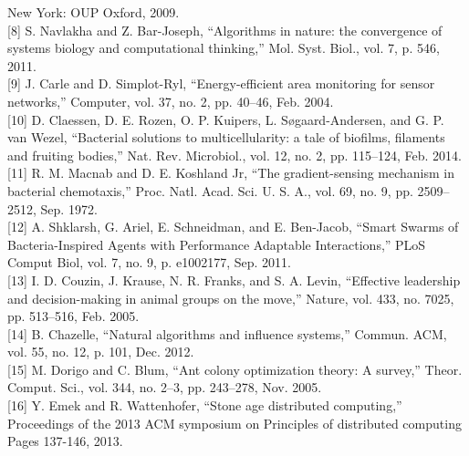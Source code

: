 \documentclass{article}
\begin{document}
New York: OUP Oxford, 2009.\\[8pt]
[8] S. Navlakha and Z. Bar-Joseph, ``Algorithms in nature: the convergence of
systems biology and computational thinking,'' Mol. Syst. Biol., vol. 7, p. 546,
2011.\\[8pt]
[9] J. Carle and D. Simplot-Ryl, ``Energy-efficient area monitoring for sensor
networks,'' Computer, vol. 37, no. 2, pp. 40–46, Feb. 2004.\\[8pt]
[10]    D. Claessen, D. E. Rozen, O. P. Kuipers, L. Søgaard-Andersen, and G. P.
van Wezel, ``Bacterial solutions to multicellularity: a tale of biofilms,
filaments and fruiting bodies,'' Nat. Rev. Microbiol., vol. 12, no. 2, pp.
115–124, Feb. 2014.\\[8pt]
[11]    R. M. Macnab and D. E. Koshland Jr, ``The gradient-sensing mechanism in
bacterial chemotaxis,'' Proc. Natl. Acad. Sci. U. S. A., vol. 69, no. 9, pp.
2509–2512, Sep. 1972.\\[8pt]
[12]    A. Shklarsh, G. Ariel, E. Schneidman, and E. Ben-Jacob, ``Smart Swarms
of Bacteria-Inspired Agents with Performance Adaptable Interactions,'' PLoS
Comput Biol, vol. 7, no. 9, p. e1002177, Sep. 2011.\\[8pt]
[13]    I. D. Couzin, J. Krause, N. R. Franks, and S. A. Levin, ``Effective
leadership and decision-making in animal groups on the move,'' Nature, vol. 433,
no. 7025, pp. 513–516, Feb. 2005.\\[8pt]
[14]    B. Chazelle, ``Natural algorithms and influence systems,'' Commun. ACM,
vol. 55, no. 12, p. 101, Dec. 2012.\\[8pt]
[15]    M. Dorigo and C. Blum, ``Ant colony optimization theory: A survey,''
Theor. Comput. Sci., vol. 344, no. 2–3, pp. 243–278, Nov. 2005.\\[8pt]
[16]    Y. Emek and R. Wattenhofer, ``Stone age distributed computing,''
Proceedings of the 2013 ACM symposium on Principles of distributed computing
Pages 137-146, 2013.
\end{document}
